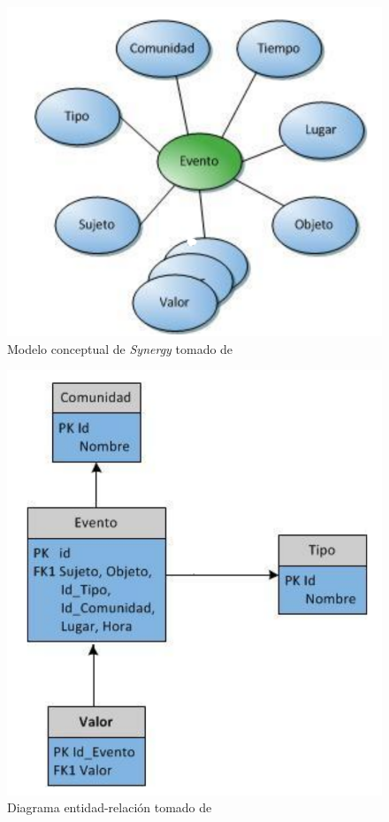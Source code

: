 \begin{figure}[tp]
	\centering
	\includegraphics[scale=.3]{images/modelo-palomino.png}
	\caption{Modelo conceptual de \textit{Synergy} tomado de \citep{Palomino:2012}}
	\label{fig:modeloconceptualpalomino}
\end{figure}

\begin{figure}[tp]
	\centering
	\includegraphics[scale=.3]{images/derpalomino.png}
	\caption{Diagrama entidad-relación tomado de \cite{Palomino:2012}}
	\label{fig:derpalomino}
\end{figure}

